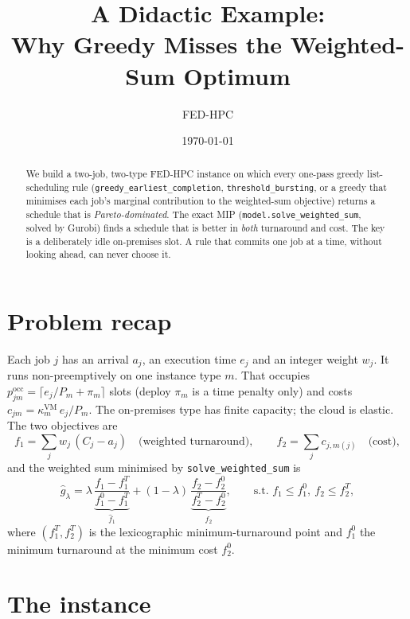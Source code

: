 \documentclass[11pt,a4paper]{article}
\title{A Didactic Example:\\ Why Greedy Misses the Weighted-Sum Optimum}
\author{FED-HPC}
\date{\today}
\newcommand{\code}[1]{\texttt{#1}}
\newcommand{\fh}{\hat f}
\begin{document}
\maketitle

\begin{abstract}
We build a two-job, two-type FED-HPC instance on which every one-pass greedy
list-scheduling rule (\code{greedy\_earliest\_completion},
\code{threshold\_bursting}, or a greedy that minimises each job's marginal
contribution to the weighted-sum objective) returns a schedule that is
\emph{Pareto-dominated}. The exact MIP (\code{model.solve\_weighted\_sum},
solved by Gurobi) finds a schedule that is better in \emph{both} turnaround and
cost. The key is a deliberately idle on-premises slot. A rule that commits
one job at a time, without looking ahead, can never choose it.
\end{abstract}

\section{Problem recap}

Each job $j$ has an arrival $a_j$, an execution time $e_j$ and an integer weight
$w_j$. It runs non-preemptively on one instance type $m$. That occupies
$p^{\mathrm{occ}}_{jm}=\lceil e_j/P_m+\pi_m\rceil$ slots (deploy $\pi_m$ is a time
penalty only) and costs $c_{jm}=\kappa^{\mathrm{VM}}_m\, e_j/P_m$. The on-premises
type has finite capacity; the cloud is elastic. The two objectives are
\[
  f_1=\sum_j w_j\,(C_j-a_j)\quad\text{(weighted turnaround)},\qquad
  f_2=\sum_j c_{j,m(j)}\quad\text{(cost)},
\]
and the weighted sum minimised by \code{solve\_weighted\_sum} is
\[
  \hat g_\lambda=\lambda\,\underbrace{\frac{f_1-f_1^T}{f_1^0-f_1^T}}_{\fh_1}
  +(1-\lambda)\,\underbrace{\frac{f_2-f_2^0}{f_2^T-f_2^0}}_{\fh_2},
  \qquad \text{s.t. } f_1\le f_1^0,\ f_2\le f_2^T,
\]
where $(f_1^T,f_2^T)$ is the lexicographic minimum-turnaround point and $f_1^0$
the minimum turnaround at the minimum cost $f_2^0$.

\section{The instance}
\end{document}
